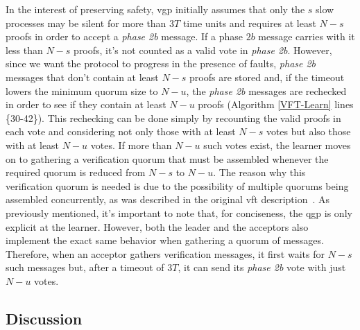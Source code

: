 In the interest of preserving safety, \acrshort{vgp} initially assumes that only the $s$ slow processes may be silent for more than $3T$ time units and requires at least $N-s$ proofs in order to accept a \textit{phase 2b} message. If a phase $2b$ message carries with it less than $N-s$ proofs, it's not counted as a valid vote in \textit{phase 2b}. However, since we want the protocol to progress in the presence of faults, \textit{phase 2b} messages that don't contain at least $N-s$ proofs are stored and, if the timeout lowers the minimum quorum size to $N-u$, the \textit{phase 2b} messages are rechecked in order to see if they contain at least $N-u$ proofs (Algorithm \ref{VFT-Learn} lines \{30-42\}). This rechecking can be done simply by recounting the valid proofs in each vote and considering not only those with at least $N-s$ votes but also those with at least $N-u$ votes. If more than $N-u$ such votes exist, the learner moves on to gathering a verification quorum that must be assembled whenever the required quorum is reduced from $N-s$ to $N-u$. The reason why this verification quorum is needed is due to the possibility of multiple quorums being assembled concurrently, as was described in the original \acrshort{vft} description~\cite{Porto2015}. As previously mentioned, it's important to note that, for conciseness, the \acrshort{qgp} is only explicit at the learner. However, both the leader and the acceptors also implement the exact same behavior when gathering a quorum of messages. Therefore, when an acceptor gathers verification messages, it first waits for $N-s$ such messages but, after a timeout of $3T$, it can send its \textit{phase 2b} vote with just $N-u$ votes.\par

\subsection{Discussion}


